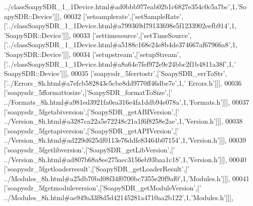 \begin{DoxyCode}
{      ../classSoapySDR\_1\_1Device.html#ad0bbb977eab02b1c6827e354c0c5a7bc'},1,\textcolor{stringliteral}{'SoapySDR::Device'}]]],
00032   [\textcolor{stringliteral}{'setsamplerate'},[\textcolor{stringliteral}{'setSampleRate'},[\textcolor{stringliteral}{'../classSoapySDR\_1\_1Device.html#a799369d79133698e5f1233902eefb914'},1,\textcolor{stringliteral}{
      'SoapySDR::Device'}]]],
00033   [\textcolor{stringliteral}{'settimesource'},[\textcolor{stringliteral}{'setTimeSource'},[\textcolor{stringliteral}{'../classSoapySDR\_1\_1Device.html#a5188c168e24e8b4de374667af67966a8'},1,\textcolor{stringliteral}{
      'SoapySDR::Device'}]]],
00034   [\textcolor{stringliteral}{'setupstream'},[\textcolor{stringliteral}{'setupStream'},[\textcolor{stringliteral}{'../classSoapySDR\_1\_1Device.html#a8a64e7fef972e9c24bbc2f1b4811a38f'},1,\textcolor{stringliteral}{'
      SoapySDR::Device'}]]],
00035   [\textcolor{stringliteral}{'soapysdr\_5ferrtostr'},[\textcolor{stringliteral}{'SoapySDR\_errToStr'},[\textcolor{stringliteral}{'../Errors\_8h.html#a7efcb582843c5cbe8dd9770ff46dbe7e'},1,\textcolor{stringliteral}{'
      Errors.h'}]]],
00036   [\textcolor{stringliteral}{'soapysdr\_5fformattosize'},[\textcolor{stringliteral}{'SoapySDR\_formatToSize'},[\textcolor{stringliteral}{'
      ../Formats\_8h.html#a981ed3921fa0ea316e4fa1ddb94e078a'},1,\textcolor{stringliteral}{'Formats.h'}]]],
00037   [\textcolor{stringliteral}{'soapysdr\_5fgetabiversion'},[\textcolor{stringliteral}{'SoapySDR\_getABIVersion'},[\textcolor{stringliteral}{'
      ../Version\_8h.html#a3287ca22a5e72248c21a1f6f8258e2ae'},1,\textcolor{stringliteral}{'Version.h'}]]],
00038   [\textcolor{stringliteral}{'soapysdr\_5fgetapiversion'},[\textcolor{stringliteral}{'SoapySDR\_getAPIVersion'},[\textcolor{stringliteral}{'
      ../Version\_8h.html#ad229d625df0113e76ddfe83464b07154'},1,\textcolor{stringliteral}{'Version.h'}]]],
00039   [\textcolor{stringliteral}{'soapysdr\_5fgetlibversion'},[\textcolor{stringliteral}{'SoapySDR\_getLibVersion'},[\textcolor{stringliteral}{'
      ../Version\_8h.html#ad807b68a8ee275aec3156eb93baa1c18'},1,\textcolor{stringliteral}{'Version.h'}]]],
00040   [\textcolor{stringliteral}{'soapysdr\_5fgetloaderresult'},[\textcolor{stringliteral}{'SoapySDR\_getLoaderResult'},[\textcolor{stringliteral}{'
      ../Modules\_8h.html#a25db70bd08f34f0700bc7355e20f9af0'},1,\textcolor{stringliteral}{'Modules.h'}]]],
00041   [\textcolor{stringliteral}{'soapysdr\_5fgetmoduleversion'},[\textcolor{stringliteral}{'SoapySDR\_getModuleVersion'},[\textcolor{stringliteral}{'
      ../Modules\_8h.html#ae949a33f8d5d42145281a4710aa2b122'},1,\textcolor{stringliteral}{'Modules.h'}]]],

\end{DoxyCode}
